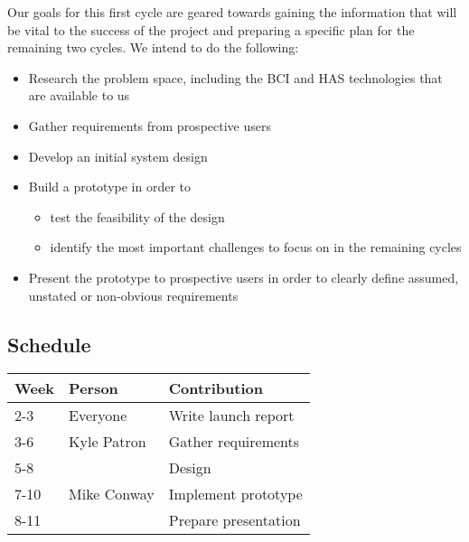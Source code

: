 \documentclass{report}
\begin{document}
Our goals for this first cycle are geared towards gaining the information that
will be vital to the success of the project and preparing a specific plan for
the remaining two cycles. We intend to do the following:
\begin{itemize}
    \item Research the problem space, including the BCI and HAS technologies
        that are available to us
    \item Gather requirements from prospective users
    \item Develop an initial system design
    \item Build a prototype in order to
        \begin{itemize}
            \item test the feasibility of the design
            \item identify the most important challenges to focus on in the
                remaining cycles
        \end{itemize}
    \item Present the prototype to prospective users in order to clearly
        define assumed, unstated or non-obvious requirements
\end{itemize}

\subsection*{Schedule}

\begin{tabular}{| l | l | l |}
    \hline
    Week & Person & Contribution \\
    \hline \hline
    2-3 & Everyone & Write launch report \\ \hline
    3-6 & Kyle Patron & Gather requirements \\ \hline
    5-8 & & Design \\ \hline
    7-10 & Mike Conway & Implement prototype \\ \hline
    8-11 & & Prepare presentation \\ \hline
\end{tabular}
\end{document}
